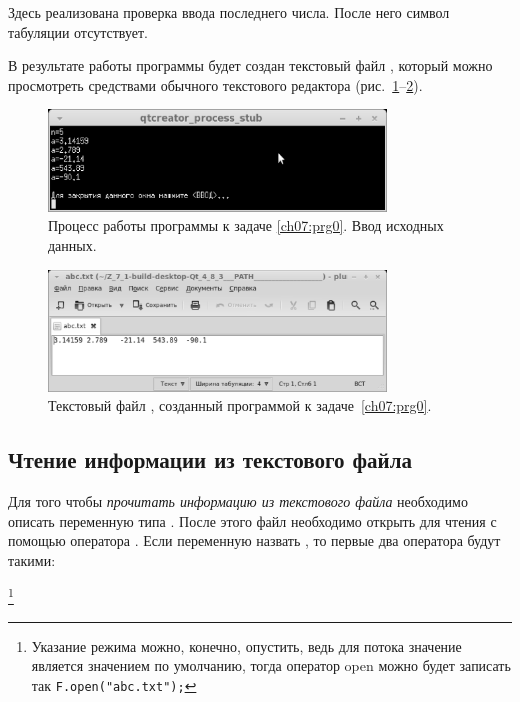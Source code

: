 Здесь реализована проверка ввода последнего числа. После него символ табуляции отсутствует.

В результате работы программы будет создан текстовый файл , который можно просмотреть
средствами обычного текстового редактора (рис.~\ref{ch07:refDrawing0}--\ref{ch07:refDrawing1}).
\begin{figure}[htb]
\begin{center}
\includegraphics[width=0.8\textwidth]{img/ris_7_1}
\caption{Процесс работы программы к задаче \ref{ch07:prg0}. Ввод исходных данных.}
\label{ch07:refDrawing0}
\end{center}
\end{figure}
\begin{figure}[htb]
\begin{center}
\includegraphics[width=0.8\textwidth]{img/ris_7_2}
\caption{Текстовый файл , созданный программой к задаче~\ref{ch07:prg0}.}
\label{ch07:refDrawing1}
\end{center}
\end{figure}

\subsection[Чтение информации из текстового файла]{Чтение информации из текстового файла}\label{ch07:2.2}

Для того чтобы \emph{прочитать информацию из текстового файла}
необходимо описать переменную типа . После этого файл необходимо открыть для чтения с
помощью оператора . Если переменную назвать , то первые два оператора будут
такими:


\footnote{Указание режима  можно, конечно, опустить,
ведь для потока  значение  является значением по умолчанию, тогда 
оператор open можно будет записать так \lstinline!F.open("abc.txt");!}

